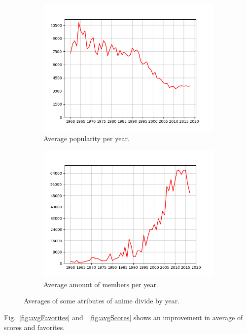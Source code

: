 \begin{figure}
\begin{subfigure}{.55\columnwidth}
		\includegraphics[width=\columnwidth]{graphics/avgPopularities.png}
		\caption{Average popularity per year.}
		\label{fig:avgPopularities}
	\end{subfigure}%
	\begin{subfigure}{.55\columnwidth}
		\centering
		\includegraphics[width=\columnwidth]{graphics/avgMembers.png}
		\caption{Average amount of members per year.}
		\label{fig:avgMembers}
	\end{subfigure}
	\caption{Averages of some atributes of anime divide by year.}
	\label{fig:averages}
\end{figure}

Fig.~\ref{fig:avgFavorites} and ~\ref{fig:avgScores} shows an improvement in average of scores and favorites. 

